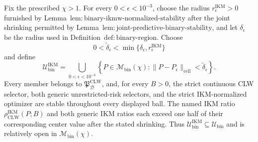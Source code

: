 Fix the prescribed \(\chi>1\). For every \(0<\epsilon<10^{-3}\), choose the radius \(r_\epsilon^{\mathrm{IKM}}>0\) furnished by Lemma~\(\mathrm{lem{:}binary\text{-}ikmw\text{-}normalized\text{-}stability}\) after the joint shrinking permitted by Lemma~\(\mathrm{lem{:}joint\text{-}predictive\text{-}binary\text{-}stability}\), and let \(\delta_\epsilon\) be the radius used in Definition~\(\mathrm{def{:}binary\text{-}region}\). Choose
\[
 0<\widetilde\delta_\epsilon
 <\min\{\delta_\epsilon,r_\epsilon^{\mathrm{IKM}}\}
\]
and define
\[
 \mathcal U_{\mathrm{bin}}^{\mathrm{IKM}}
 =\bigcup_{0<\epsilon<10^{-3}}
 \left\{P\in\mathcal M_{\mathrm{bin}}(\chi):
 \|P-P_\epsilon\|_{\mathrm{cell}}<\widetilde\delta_\epsilon\right\}. \tag{1}
\]
Every member belongs to \(\mathfrak P_{\mathcal D}^{\mathrm{CLW}}\), and, for every \(B>0\), the strict continuous CLW selector, both generic unrestricted-risk selectors, and the strict IKM-normalized optimizer are stable throughout every displayed ball. The named IKM ratio \(\rho_{\mathrm{CLW}}^{\mathrm{IKM}}(P;B)\) and both generic IKM ratios each exceed one half of their corresponding center value after the stated shrinking. Thus \(\mathcal U_{\mathrm{bin}}^{\mathrm{IKM}}\subseteq\mathcal U_{\mathrm{bin}}\) and is relatively open in \(\mathcal M_{\mathrm{bin}}(\chi)\).